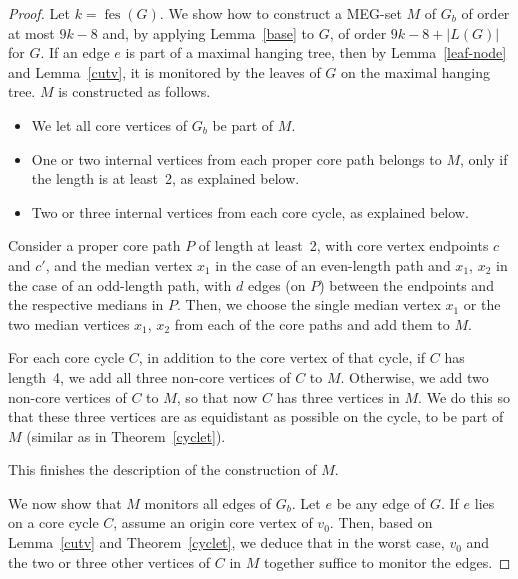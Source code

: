 \documentclass[10pt,a4paper]{article}
\DeclareMathOperator{\fes}{fes}
\begin{document}
\begin{proof}
Let $k = \fes(G)$. We show how to construct a MEG-set $M$ of $G_b$ of order at most $9k-8$ and, by applying Lemma~\ref{base} to $G$, of order $9k-8 + |L(G)|$ for $G$. If an edge $e$ is part of a maximal hanging tree, then by Lemma~\ref{leaf-node} and Lemma~\ref{cutv}, it is monitored by the leaves of $G$ on the maximal hanging tree. $M$ is constructed as follows. 
\begin{itemize}
    \item We let all core vertices of $G_b$ be part of $M$.
    \item One or two internal vertices from each proper core path belongs to $M$, only if the length is at least~2, as explained below.
    \item Two or three internal vertices from each core cycle, as explained below.
\end{itemize}

Consider a proper core path $P$ of length at least~2, with core vertex endpoints $c$ and $c'$, and the median vertex $x_1$ in the case of an even-length path and $x_1$, $x_2$ in the case of an odd-length path, with $d$ edges (on $P$) between the endpoints and the respective medians in $P$. Then, we choose the single median vertex $x_1$ or the two median vertices $x_1$, $x_2$ from each of the core paths and add them to $M$.

For each core cycle $C$, in addition to the core vertex of that cycle, if $C$ has length~4, we add all three non-core vertices of $C$ to $M$. Otherwise, we add two non-core vertices of $C$ to $M$, so that now $C$ has three vertices in $M$. We do this so that these three vertices are as equidistant as possible on the cycle, to be part of $M$ (similar as in Theorem~\ref{cyclet}). %

This finishes the description of the construction of $M$.

\medskip

We now show that $M$ monitors all edges of $G_b$. Let $e$ be any edge of $G$. If $e$ lies on a core cycle $C$, assume an origin core vertex of $v_0$. Then, based on Lemma~\ref{cutv} and Theorem~\ref{cyclet}, we deduce that in the worst case, $v_0$ and the two or three other vertices of $C$ in $M$ together suffice to monitor the edges.


\end{proof}
\end{document}
